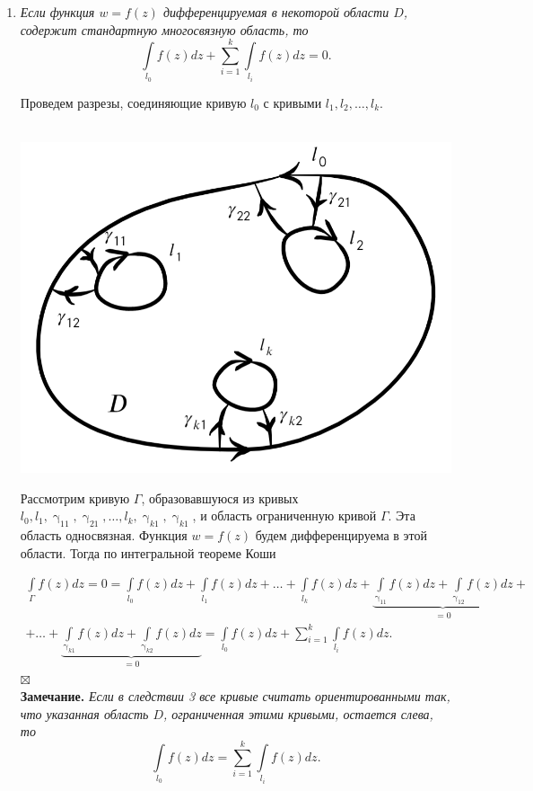 \documentclass[a4paper, 12pt]{article}
\newenvironment{Proof} %
{\par\noindent{$\blacklozenge$}} %
{\hfill$\scriptstyle\boxtimes$}
\renewcommand{\gamma}{\upgamma}
\begin{document}
\begin{enumerate}
\item \textit{Если функция $w = f(z)$ дифференцируемая в некоторой области $D$, содержит стандартную многосвязную область, то} $$\int\limits_{l_0} f(z)dz + \sum_{i = 1}^{k}\int\limits_{l_i}f(z)dz= 0.$$\begin{Proof}
	Проведем разрезы, соединяющие кривую $l_0$ с кривыми $l_1, l_2,\ldots, l_k$.\\\\
	\noindent
	\parbox[b][5cm][t]{10mm}{
		\includegraphics[scale=0.35]{images/028.png}}
	\hfill
	\parbox[b][4cm][t]{100mm}{Рассмотрим кривую $\Gamma$, образовавшуюся из кривых $l_0, l_1, \gamma_{11}, \gamma_{21}, \ldots, l_k, \gamma_{k1}, \gamma_{k1}$, и область ограниченную кривой $\Gamma$. Эта область односвязная. Функция $w = f(z)$ будем дифференцируема в этой области. Тогда по интегральной теореме Коши}\begin{multline*}
		\int\limits_{\Gamma} f(z)dz = 0 = \int\limits_{l_0} f(z)dz + \int\limits_{l_1} f(z)dz + \ldots + \int\limits_{l_k} f(z)dz + \underbrace{\int\limits_{\gamma_{11}} f(z)dz + \int\limits_{\gamma_{12}} f(z)dz}_{=0} +\\+ \ldots + \underbrace{\int\limits_{\gamma_{k1}} f(z)dz + \int\limits_{\gamma_{k2}} f(z)dz}_{=0} = \int\limits_{l_0} f(z)dz + \sum_{i = 1}^{k}\int\limits_{l_i}f(z)dz.
	\end{multline*}
\end{Proof}\\
\textbf{Замечание.} \textit{Если в следствии 3 все кривые считать ориентированными так, что указанная область $D$, ограниченная этими кривыми, остается слева, то} $$\int\limits_{l_0} f(z)dz =\sum_{i = 1}^{k}\int\limits_{l_i}f(z)dz.$$

\end{enumerate}
\end{document}
